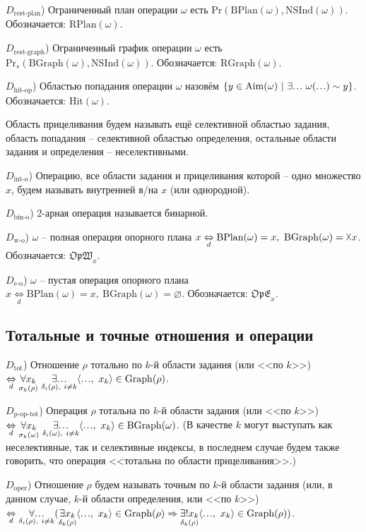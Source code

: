 \documentclass[a4paper]{article}
\newcommand\mydots{\hbox to 1em{.\hss.\hss.}}
\newcommand{\Def}[0]{\underset{d}{\Leftrightarrow}}
\newcommand{\Prmy}[2]{\mathrm{Pr}(#1, #2)}
\newcommand{\Prmys}[2]{\mathrm{Pr}_s(#1, #2)}
\newcommand{\Graph}[1]{\mathrm{Graph}(#1)}
\newcommand{\BPlan}[1]{\mathrm{BPlan}(#1)}
\newcommand{\BGraph}[1]{\mathrm{BGraph}(#1)}
\newcommand{\RPlan}[1]{\mathrm{RPlan}(#1)}
\newcommand{\RGraph}[1]{\mathrm{RGraph}(#1)}
\newcommand{\NSInd}[1]{\mathrm{NSInd}(#1)}
\newcommand{\Aim}[1]{\mathrm{Aim}(#1)}
\newcommand{\Hit}[1]{\mathrm{Hit}(#1)}
\begin{document}
$D_\text{rest-plan}$) Ограниченный план операции $\omega$ есть $\Prmy{\BPlan{\omega}}{\NSInd{\omega}}$. Обозначается: $\RPlan{\omega}$.

$D_\text{rest-graph}$) Ограниченный график операции $\omega$ есть $\Prmys{\BGraph{\omega}}{\NSInd{\omega}}$. Обозначается: $\RGraph{\omega}$.

$D_\text{hit-op}$) Областью попадания операции $\omega$ назовём $\{ y \in \Aim{\omega} ~|~ \exists \mydots~ \omega(\mydots) \sim y \}$. Обозначается: $\Hit{\omega}$.

Область прицеливания будем называть ещё селективной областью задания, область попадания -- селективной областью определения, остальные области задания и определения -- неселективными.

$D_\text{int-o}$) Операцию, все области задания и прицеливания которой -- одно множество $x$, будем называть внутренней в/на $x$ (или однородной).

$D_\text{bin-o}$) 2-арная операция называется бинарной.

$D_\text{w-o}$) $\omega$ -- полная операция опорного плана $x \Def \BPlan{\omega} = x,~ \BGraph{\omega} = \vartimes x$. Обозначается: $\mathfrak{OpW}_x$.

$D_\text{e-o}$) $\omega$ -- пустая операция опорного плана $x \Def \BPlan{\omega} = x,~ \BGraph{\omega} = \varnothing$. Обозначается: $\mathfrak{OpE}_x$.

\subsection{Тотальные и точные отношения и операции}

$D_\text{tot}$) Отношение $\rho$ тотально по $k$-й области задания (или <<по $k$>>) $\Def \underset{\sigma_k(\rho)}{\forall x_k}~ \underset{\delta_i(\rho),~ i \ne k}{\exists \mydots} \langle \mydots,~ x_k \rangle \in \Graph{\rho}$. 

$D_\text{p-op-tot}$) Операция $\rho$ тотальна по $k$-й области задания (или <<по $k$>>) $\Def \underset{\sigma_k(\omega)}{\forall x_k}~ \underset{\delta_i(\omega),~ i \ne k}{\exists \mydots} \langle \mydots,~ x_k \rangle \in \BGraph{\omega}$. (В качестве $k$ могут выступать как неселективные, так и селективные индексы, в последнем случае будем также говорить, что операция <<тотальна по области прицеливания>>.)

$D_\text{oper}$) Отношение $\rho$ будем называть точным по $k$-й области задания (или, в данном случае, $k$-й области определения, или <<по $k$>>) $\Def \underset{\delta_i(\rho),~ i \ne k}{\forall \mydots} (\underset{\delta_k(\rho)}{\exists x_k} \langle \mydots,~ x_k \rangle \in \Graph{\rho} \Rightarrow \underset{\delta_k(\rho)}{\exists! x_k} \langle \mydots,~ x_k \rangle \in \Graph{\rho})$.
\end{document}
